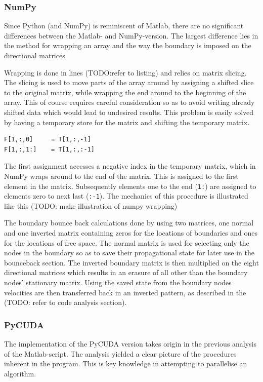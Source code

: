 \subsubsection{NumPy}
Since Python (and NumPy) is reminiscent of Matlab, there are no significant differences between the Matlab- and NumPy-version. The largest difference lies in the method for wrapping an array and the way the boundary is imposed on the directional matrices.

Wrapping is done in lines (TODO:refer to listing) and relies on matrix slicing. The slicing is used to move parts of the array around by assigning a shifted slice to the original matrix, while wrapping the end around to the beginning of the array. This of course requires careful consideration so as to avoid writing already shifted data which would lead to undesired results. This problem is easily solved by having a temporary store for the matrix and shifting the temporary matrix.

\begin{verbatim}
F[1,:,0]     = T[1,:,-1]
F[1,:,1:]    = T[1,:,:-1]
\end{verbatim}

The first assignment accesses a negative index in the temporary matrix, which in NumPy wraps around to the end of the matrix. This is assigned to the first element in the matrix. Subsequently elements one to the end (\texttt{1:}) are assigned to elements zero to next last (\texttt{:-1}). The mechanics of this procedure is illustrated like this (TODO: make illustration of numpy wrapping)

The boundary bounce back calculations done by using two matrices, one normal and one inverted matrix containing zeros for the locations of boundaries and ones for the locations of free space. The normal matrix is used for selecting only the nodes in the boundary so as to save their propagational state for later use in the bounceback section. The inverted boundary matrix is then multiplied on the eight directional matrices which results in an erasure of all other than the boundary nodes' stationary matrix. Using the saved state from the boundary nodes velocities are then transferred back in an inverted pattern, as described in the (TODO: refer to code analysis section).


\subsubsection{PyCUDA}
The implementation of the PyCUDA version takes origin in the previous analysis of the Matlab-script. The analysis yielded a clear picture of the procedures inherent in the program. This is key knowledge in attempting to parallelise an algorithm.

